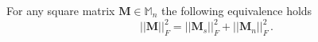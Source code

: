 %
\begin{lemma}
\label{lemma-norm-symmetric-skew-symmetric} 
%
For any square matrix $\bm{M} \in \mathbb{M}_n$ the following equivalence holds
%
\begin{equation}
    ||\bm{M}||_F^2 = ||\bm{M}_s||_F^2 + ||\bm{M}_n||_F^2 \,.
\end{equation}
%
\end{lemma}
%